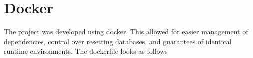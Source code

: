 \section{Docker}
The project was developed using docker.
This allowed for easier management of dependencies, control over resetting databases, and guarantees of identical runtime environments.
The dockerfile looks as follows


